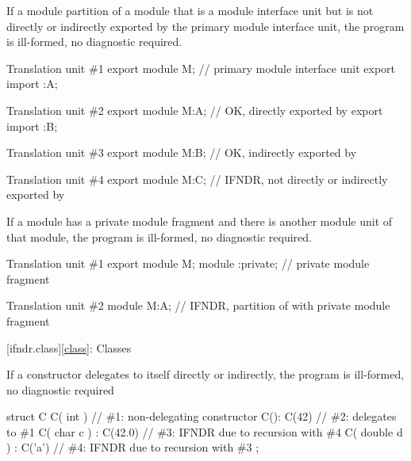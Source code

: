 
\pnum
If a module partition of a module
that is a module interface unit
but is not directly or indirectly exported
by the primary module interface unit,
the program is ill-formed, no diagnostic required.

\pnum
\begin{example}
\begin{codeblocktu}{Translation unit \#1}
export module M;    // primary module interface unit
export import :A;
\end{codeblocktu}
\begin{codeblocktu}{Translation unit \#2}
export module M:A;  // OK, directly exported by 
export import :B;
\end{codeblocktu}
\begin{codeblocktu}{Translation unit \#3}
export module M:B;  // OK, indirectly exported by 
\end{codeblocktu}
\begin{codeblocktu}{Translation unit \#4}
export module M:C;  // IFNDR, not directly or indirectly exported by 
\end{codeblocktu}
\end{example}


\pnum
If a module has a private module fragment
and there is another module unit of that module,
the program is ill-formed, no diagnostic required.

\pnum
\begin{example}
\begin{codeblocktu}{Translation unit \#1}
export module M;
module :private;    // private module fragment
\end{codeblocktu}
\begin{codeblocktu}{Translation unit \#2}
module M:A;         // IFNDR, partition of  with private module fragment
\end{codeblocktu}
\end{example}

[ifndr.class]{\ref*{class}: Classes}


\pnum
If a constructor delegates to itself directly or indirectly,
the program is ill-formed, no diagnostic required

\pnum
\begin{example}
\begin{codeblock}
struct C {
  C( int ) { }                  // \#1: non-delegating constructor
  C(): C(42) { }                // \#2: delegates to \#1
  C( char c ) : C(42.0) { }     // \#3: IFNDR due to recursion with \#4
  C( double d ) : C('a') { }    // \#4: IFNDR due to recursion with \#3
};
\end{codeblock}
\end{example}

